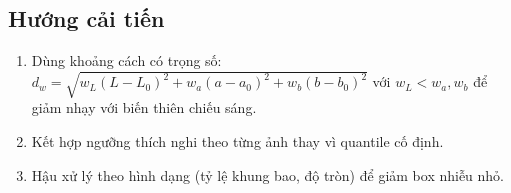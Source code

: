 \documentclass[12pt,a4paper]{article}
\begin{document}
\subsection{Hướng cải tiến}
\begin{enumerate}
    \item Dùng khoảng cách có trọng số:
    $d_w=\sqrt{w_L(L-L_0)^2+w_a(a-a_0)^2+w_b(b-b_0)^2}$ với $w_L<w_a,w_b$
    để giảm nhạy với biến thiên chiếu sáng.
    \item Kết hợp ngưỡng thích nghi theo từng ảnh thay vì quantile cố định.
    \item Hậu xử lý theo hình dạng (tỷ lệ khung bao, độ tròn) để giảm box nhiễu nhỏ.
\end{enumerate}
\end{document}
